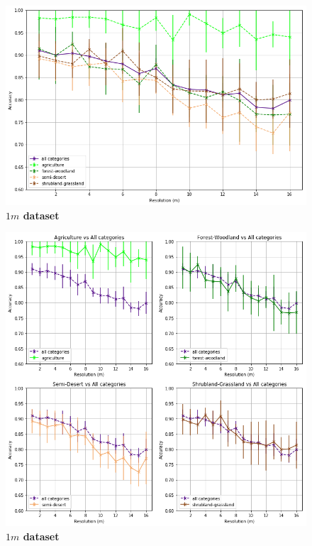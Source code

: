 \begin{figure}[h!]
	\centering
	\includegraphics[width=\textwidth]{Figures/results/acc_res_all_categories_1m.png}
	\captionsetup{width=1\linewidth}
	\caption{\textbf{$1m$ dataset}}
	\label{fig:acc_all_cat_1m}
\end{figure}

\begin{figure}[h!]
	\centering
	\includegraphics[width=\textwidth]{Figures/results/acc_res_by_category_1m.png}
	\captionsetup{width=1\linewidth}
	\caption{\textbf{$1m$ dataset}}
	\label{fig:acc_by_cat_1m}
\end{figure}


